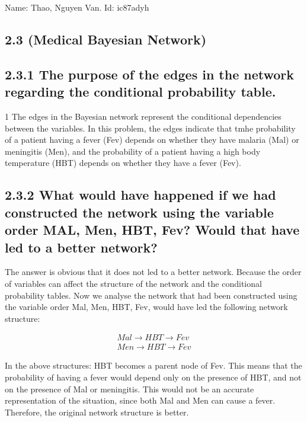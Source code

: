\documentclass{article}
\begin{document}
Name: Thao, Nguyen Van.   Id: ic87adyh

\subsection*{\textbf{2.3 (Medical Bayesian Network)}}
    \subsection*{\textbf{2.3.1  The purpose of the edges in the network regarding the conditional probability table. }}1
    The edges in the Bayesian network represent the conditional dependencies between the variables. In this problem,  the edges indicate that tmhe probability of a patient having a fever (Fev) depends on whether they have malaria (Mal) or meningitis (Men), and the probability of a patient having a high body temperature (HBT) depends on whether they have a fever (Fev).
    
     \subsection*{\textbf{2.3.2  What would have happened if we had constructed the network using the variable order MAL, Men,  HBT,  Fev? Would that have led to a better network?}}
     The answer is obvious that it does not led to a better network. Because the order of variables can affect the structure of the network and the conditional probability tables.  Now we analyse  the network that had been constructed using the variable order Mal, Men, HBT, Fev, would have led the following network structure:  
     
     \begin{align*}     
     Mal \rightarrow   HBT \rightarrow Fev\\
     Men \rightarrow HBT \rightarrow Fev
	\end{align*}
	 
	 In the above structures: HBT  becomes a parent node of Fev. This means that the probability of having a fever would depend only on the presence of HBT,  and not on the presence of Mal or meningitis. This would not be an accurate representation of the situation, since both Mal and Men can cause a fever. Therefore, the original network structure is better.
\end{document}
